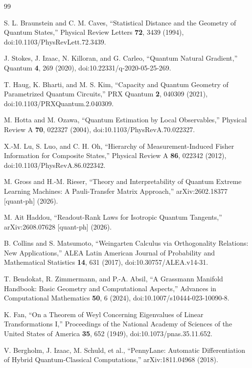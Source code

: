 \documentclass[ASNA,twocolumn]{USG}
\begin{document}
\clearpage
\begin{thebibliography}{99}

S. L. Braunstein and C. M. Caves,
``Statistical Distance and the Geometry of Quantum States,''
Physical Review Letters \textbf{72}, 3439 (1994), doi:10.1103/PhysRevLett.72.3439.

J. Stokes, J. Izaac, N. Killoran, and G. Carleo,
``Quantum Natural Gradient,''
Quantum \textbf{4}, 269 (2020), doi:10.22331/q-2020-05-25-269.

T. Haug, K. Bharti, and M. S. Kim,
``Capacity and Quantum Geometry of Parametrized Quantum Circuits,''
PRX Quantum \textbf{2}, 040309 (2021), doi:10.1103/PRXQuantum.2.040309.

M. Hotta and M. Ozawa,
``Quantum Estimation by Local Observables,''
Physical Review A \textbf{70}, 022327 (2004), doi:10.1103/PhysRevA.70.022327.

X.-M. Lu, S. Luo, and C. H. Oh,
``Hierarchy of Measurement-Induced Fisher Information for Composite States,''
Physical Review A \textbf{86}, 022342 (2012), doi:10.1103/PhysRevA.86.022342.

M. Gross and H.-M. Rieser,
``Theory and Interpretability of Quantum Extreme Learning Machines: A Pauli-Transfer Matrix Approach,''
arXiv:2602.18377 [quant-ph] (2026).

M. Ait Haddou,
``Readout-Rank Laws for Isotropic Quantum Tangents,''
arXiv:2608.07628 [quant-ph] (2026).

B. Collins and S. Matsumoto,
``Weingarten Calculus via Orthogonality Relations: New Applications,''
ALEA Latin American Journal of Probability and Mathematical Statistics \textbf{14}, 631 (2017), doi:10.30757/ALEA.v14-31.

T. Bendokat, R. Zimmermann, and P.-A. Absil,
``A Grassmann Manifold Handbook: Basic Geometry and Computational Aspects,''
Advances in Computational Mathematics \textbf{50}, 6 (2024), doi:10.1007/s10444-023-10090-8.

K. Fan,
``On a Theorem of Weyl Concerning Eigenvalues of Linear Transformations I,''
Proceedings of the National Academy of Sciences of the United States of America \textbf{35}, 652 (1949), doi:10.1073/pnas.35.11.652.

V. Bergholm, J. Izaac, M. Schuld, et al.,
``PennyLane: Automatic Differentiation of Hybrid Quantum-Classical Computations,''
arXiv:1811.04968 (2018).


\end{thebibliography}
\end{document}
